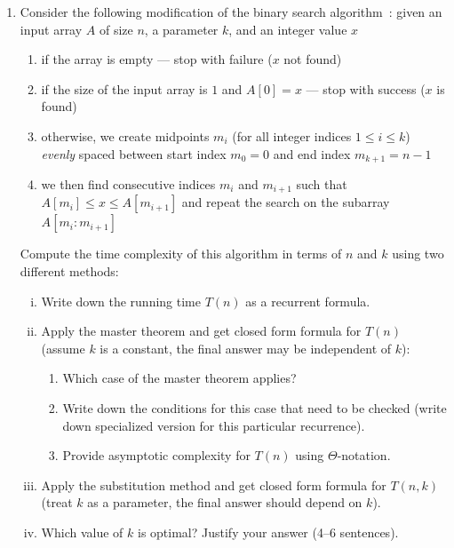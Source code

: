 \documentclass[dvipsnames]{article}
\begin{document}
\begin{enumerate}
  \clearpage
  \item Consider the following modification of the binary search algorithm~\cite[Exercise~2.3-6]{Cormen2022}:
  given an input array $A$ of size $n$, a parameter $k$, and an integer value $x$
  \begin{enumerate}
    \item if the array is empty — stop with failure ($x$ not found)
    \item if the size of the input array is $1$ and $A[0] = x$ — stop with success ($x$ is found)
    \item otherwise, we create midpoints $m_i$ (for all integer indices $1 \leq i \leq k$)
      \emph{evenly} spaced between start index $m_0 = 0$ and end index $m_{k+1} = n - 1$
    \item we then find consecutive indices $m_i$ and $m_{i+1}$ such that $A[m_i] \leq x \leq A[m_{i+1}]$
      and repeat the search on the subarray $A[m_i:m_{i+1}]$
  \end{enumerate}

  Compute the time complexity of this algorithm in terms of $n$ and $k$ using two different methods:
  \begin{enumerate}[(i)]
    \item Write down the running time $T(n)$ as a recurrent formula.
    \item Apply the master theorem and get closed form formula for $T(n)$ (assume $k$ is a constant, the final answer may be independent of $k$):
      \begin{enumerate}
        \item Which case of the master theorem applies?
        \item Write down the conditions for this case that need to be checked (write down specialized version for this particular recurrence).
        \item Provide asymptotic complexity for $T(n)$ using $\Theta$-notation.
      \end{enumerate}

    \item Apply the substitution method and get closed form formula for $T(n, k)$ (treat $k$ as a parameter, the final answer should depend on $k$).
    \item Which value of $k$ is optimal? Justify your answer (4--6 sentences).
  \end{enumerate}


\end{enumerate}
\end{document}
